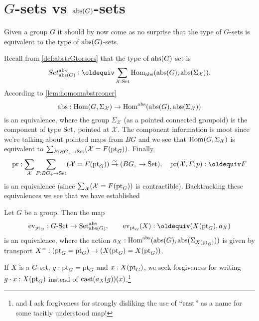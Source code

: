 \section{$G$-sets vs $\mathrm{abs}(G)$-sets}
\label{sec:Gsetsabstrconcr}

Given a group $G$ it should by now come as no surprise that the type of $G$-sets is equivalent to the type of $\mathrm{abs}(G)$-sets.

Recall from \cref{def:abstrGtorsors} that the type of $\mathrm{abs}(G)$-set is
$$Set_{\abstr(G)}^\abstr\defequi \sum_{\mathcal X:\Set}\Hom_\abstr({\abstr(G)},\abstr(\Sigma_{\mathcal X})).$$
According to \cref{lem:homomabstrconcr}
$$\mathrm{abs}:\mathrm{Hom}(G,\Sigma_{\mathcal X})\to\mathrm{Hom}^{\mathrm{abs}}(\mathrm{abs}(G),\mathrm{abs}(\Sigma_{\mathcal X}))$$
is an equivalence, where the group $\Sigma_{\mathcal X}$ (as a pointed connected groupoid) is the component of type $\mathord{\mathrm{Set}}$, pointed at $\mathcal X$.  The component information is moot since we're talking about pointed maps from $BG$ and we see that $\mathrm{Hom}(G,\Sigma_{\mathcal X})$ is equivalent to $\sum_{F:BG_\div\to\Set}(\mathcal X=F(\pt_G))$.  Finally, 
$$\mathrm{pr}:\sum_{\mathcal X}\sum_{F:BG_\div\to\Set}(\mathcal X=F(\pt_G))\we 
(BG_\div\to\Set),\quad \mathrm{pr}(\mathcal X,F,p)\defequi F
$$
is an equivalence (since $\sum_{\mathcal X}(\mathcal X=F(\mathrm{pt}_G))$ is contractible).  
Backtracking these equivalences we see that we have established
\begin{lemma}
  \label{lem:actionsconcreteandabstract}
  Let $G$ be a group.  Then the map
  $$\ev_{\pt_G}:\GSet\to\Set^\abstr_{\abstr(G)},\qquad \ev_{\pt_G}(X)\defequi(X(\pt_G),a_X)
$$
is an equivalence, where the action $a_X:\mathrm{Hom}^{\mathrm{abs}}(\mathrm{abs}(G), \mathrm{abs}(\Sigma_{X(\mathrm{pt}_G)}))$ is given by transport $X^=:(\mathrm{pt}_G=\mathrm{pt}_G)\to (X(\mathrm{pt}_G)=X(\mathrm{pt}_G))$.
\end{lemma}
If $X$ is a $G$-set, $g:\mathrm{pt}_G=\mathrm{pt}_G$ and $x:X(\mathrm{pt}_G)$, we seek forgiveness for writing $g\cdot x:X(\mathrm{pt}_G)$ instead of $\mathrm{cast}(a_X(g))(x)$.\footnote{and I ask forgiveness for strongly disliking the use of ``$\mathrm{cast}$'' as a name for some tacitly understood map!}

